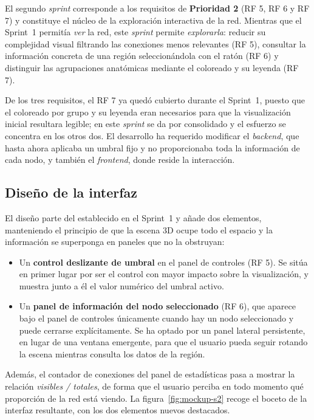El segundo \textit{sprint} corresponde a los requisitos de \textbf{Prioridad 2} (RF 5, RF 6 y RF 7) y
constituye el núcleo de la exploración interactiva de la red. Mientras que el Sprint~1 permitía
\emph{ver} la red, este \textit{sprint} permite \emph{explorarla}: reducir su complejidad visual
filtrando las conexiones menos relevantes (RF 5), consultar la información concreta de una región
seleccionándola con el ratón (RF 6) y distinguir las agrupaciones anatómicas mediante el coloreado y
su leyenda (RF 7).

De los tres requisitos, el RF 7 ya quedó cubierto durante el Sprint~1, puesto que el coloreado por
grupo y su leyenda eran necesarios para que la visualización inicial resultara legible; en este
\textit{sprint} se da por consolidado y el esfuerzo se concentra en los otros dos. El desarrollo ha
requerido modificar el \textit{backend}, que hasta ahora aplicaba un umbral fijo y no proporcionaba
toda la información de cada nodo, y también el \textit{frontend}, donde reside la interacción.

\subsection{Diseño de la interfaz}

El diseño parte del establecido en el Sprint~1 y añade dos elementos, manteniendo el principio de que
la escena 3D ocupe todo el espacio y la información se superponga en paneles que no la obstruyan:

\begin{itemize}
	\item Un \textbf{control deslizante de umbral} en el panel de controles (RF 5). Se sitúa en primer
		lugar por ser el control con mayor impacto sobre la visualización, y muestra junto a él el valor
		numérico del umbral activo.
	\item Un \textbf{panel de información del nodo seleccionado} (RF 6), que aparece bajo el panel de
		controles únicamente cuando hay un nodo seleccionado y puede cerrarse explícitamente. Se ha
		optado por un panel lateral persistente, en lugar de una ventana emergente, para que el usuario
		pueda seguir rotando la escena mientras consulta los datos de la región.
\end{itemize}

Además, el contador de conexiones del panel de estadísticas pasa a mostrar la relación
\textit{visibles / totales}, de forma que el usuario perciba en todo momento qué proporción de la red
está viendo. La figura~\ref{fig:mockup-s2} recoge el boceto de la interfaz resultante, con los dos
elementos nuevos destacados.

